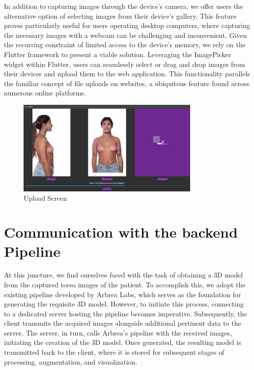 In addition to capturing images through the device's camera, we offer users the alternative option of selecting images from their device's gallery. This feature proves particularly useful 
for users operating desktop computers, where capturing the necessary images with a webcam can be challenging and inconvenient. Given the recurring constraint of limited access to the device's memory, 
we rely on the Flutter framework to present a viable solution. Leveraging the ImagePicker widget within Flutter, users can seamlessly select or drag and drop images from their devices 
and upload them to the web application. This functionality parallels the familiar concept of file uploads on websites, a ubiquitous feature found across numerous online platforms. 

\begin{figure}[H]
    \centering
    \includegraphics[width = 0.8\textwidth]{figures/upload_drag_and_drop.png}
    \caption{Upload Screen}
    \label{fig:deag_and_drop}
\end{figure}

\section{Communication with the backend Pipeline}

At this juncture, we find ourselves faced with the task of obtaining a 3D model from the captured torso images of the patient. To accomplish this, we adopt the existing pipeline developed by Arbrea Labs, 
which serves as the foundation for generating the requisite 3D model. However, to initiate this process, connecting to a dedicated server hosting the pipeline becomes imperative. 
Subsequently, the client transmits the acquired images alongside additional pertinent data to the server. The server, in turn, calls Arbrea's pipeline with the received images, 
initiating the creation of the 3D model. Once generated, the resulting model is transmitted back to the client, where it is stored for subsequent stages of processing, augmentation, and visualization.

